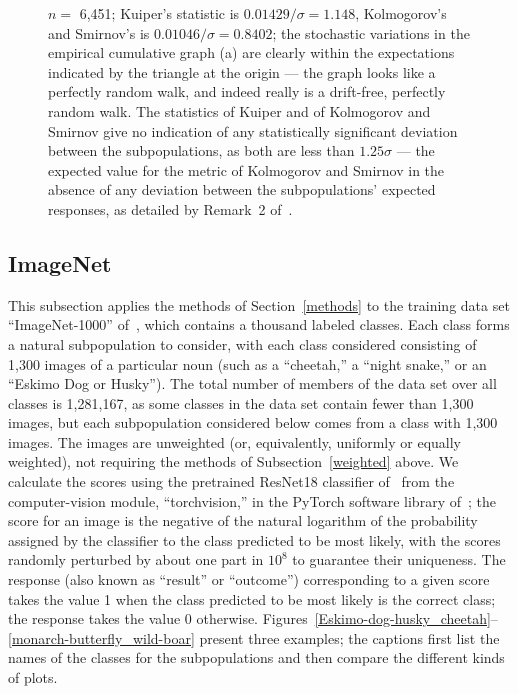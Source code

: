\documentclass{article}
\begin{document}
\begin{figure}
\begin{centering}
\end{centering}
\caption{$n =$ 6,451; Kuiper's statistic is $0.01429 / \sigma = 1.148$,
         Kolmogorov's and Smirnov's is $0.01046 / \sigma = 0.8402$;
         the stochastic variations in the empirical cumulative graph (a)
         are clearly within the expectations indicated by the triangle
         at the origin --- the graph looks like a perfectly random walk,
         and indeed really is a drift-free, perfectly random walk.
         The statistics of Kuiper and of Kolmogorov and Smirnov
         give no indication of any statistically significant deviation
         between the subpopulations, as both are less than $1.25 \sigma$ ---
         the expected value for the metric of Kolmogorov and Smirnov
         in the absence of any deviation between the subpopulations'
         expected responses, as detailed by Remark~2 of~\cite{tygert}.
}
\label{ex3}
\end{figure}



\subsection{ImageNet}
\label{imagenetex}

This subsection applies the methods of Section~\ref{methods}
to the training data set ``ImageNet-1000'' of~\cite{imagenet},
which contains a thousand labeled classes.
Each class forms a natural subpopulation to consider,
with each class considered consisting of 1,300 images of a particular noun
(such as a ``cheetah,'' a ``night snake,'' or an ``Eskimo Dog or Husky'').
The total number of members of the data set over all classes is 1,281,167,
as some classes in the data set contain fewer than 1,300 images,
but each subpopulation considered below comes from a class with 1,300 images.
The images are unweighted (or, equivalently, uniformly or equally weighted),
not requiring the methods of Subsection~\ref{weighted} above.
We calculate the scores using the pretrained ResNet18 classifier
of~\cite{he-zhang-ren-sun} from the computer-vision module, ``torchvision,''
in the PyTorch software library of~\cite{pytorch};
the score for an image is the negative of the natural logarithm
of the probability assigned by the classifier
to the class predicted to be most likely,
with the scores randomly perturbed by about one part in $10^8$ to guarantee
their uniqueness.
The response (also known as ``result'' or ``outcome'') corresponding
to a given score takes the value 1 when the class predicted to be most likely
is the correct class; the response takes the value 0 otherwise.
Figures~\ref{Eskimo-dog-husky_cheetah}--\ref{monarch-butterfly_wild-boar}
present three examples; the captions first list the names of the classes
for the subpopulations and then compare the different kinds of plots.
\end{document}

